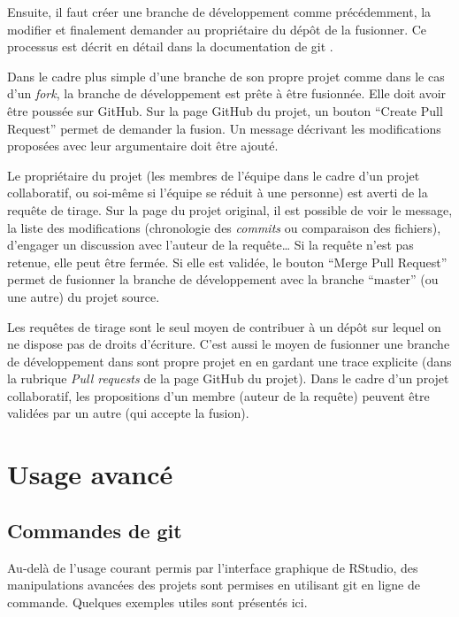 \documentclass[
  12pt,
  french,
  a4paper,
  extrafontsizes,onecolumn,openright
  ]{memoir}
\newlength{\rf}
\begin{document}
Ensuite, il faut créer une branche de développement comme précédemment, la modifier et finalement demander au propriétaire du dépôt de la fusionner.
Ce processus est décrit en détail dans la documentation de git .

Dans le cadre plus simple d'une branche de son propre projet comme dans le cas d'un \emph{fork}, la branche de développement est prête à être fusionnée.
Elle doit avoir être poussée sur GitHub.
Sur la page GitHub du projet, un bouton \enquote{Create Pull Request} permet de demander la fusion.
Un message décrivant les modifications proposées avec leur argumentaire doit être ajouté.

Le propriétaire du projet (les membres de l'équipe dans le cadre d'un projet collaboratif, ou soi-même si l'équipe se réduit à une personne) est averti de la requête de tirage.
Sur la page du projet original, il est possible de voir le message, la liste des modifications (chronologie des \emph{commits} ou comparaison des fichiers), d'engager un discussion avec l'auteur de la requête\ldots{}
Si la requête n'est pas retenue, elle peut être fermée.
Si elle est validée, le bouton \enquote{Merge Pull Request} permet de fusionner la branche de développement avec la branche \enquote{master} (ou une autre) du projet source.

Les requêtes de tirage sont le seul moyen de contribuer à un dépôt sur lequel on ne dispose pas de droits d'écriture.
C'est aussi le moyen de fusionner une branche de développement dans sont propre projet en en gardant une trace explicite (dans la rubrique \emph{Pull requests} de la page GitHub du projet).
Dans le cadre d'un projet collaboratif, les propositions d'un membre (auteur de la requête) peuvent être validées par un autre (qui accepte la fusion).

\hypertarget{usage-avancuxe9}{%
\section{Usage avancé}\label{usage-avancuxe9}}

\hypertarget{commandes-de-git}{%
\subsection{Commandes de git}\label{commandes-de-git}}

Au-delà de l'usage courant permis par l'interface graphique de RStudio, des manipulations avancées des projets sont permises en utilisant git en ligne de commande.
Quelques exemples utiles sont présentés ici.
\end{document}
